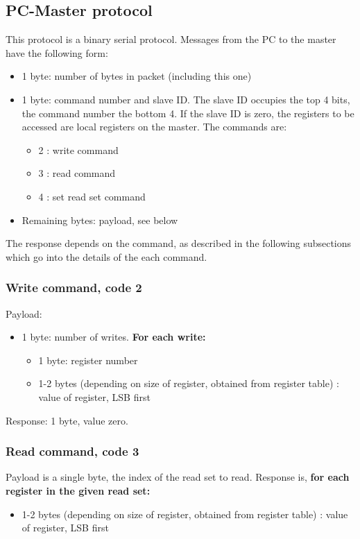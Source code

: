 \subsection{PC-Master protocol}
This protocol is a binary serial protocol. Messages from
the PC to the master have the following form:
\begin{itemize}
\item 1 byte: number of bytes in packet (including this one)
\item 1 byte: command number and slave ID. The slave ID occupies
the top 4 bits, the command number the bottom 4. If the slave
ID is zero, the registers to be accessed are local registers
on the master. The commands are:
\begin{itemize}
\item 2 : write command
\item 3 : read command
\item 4 : set read set command
\end{itemize}
\item Remaining bytes: payload, see below
\end{itemize}
The response depends on the command, as described in the following
subsections which go into the details of  the each command.
\subsubsection{Write command, code 2}
Payload:
\begin{itemize}
\item 1 byte: number of writes. \textbf{For each write:}
\begin{itemize}
\item 1 byte: register number
\item 1-2 bytes (depending on size of register,
obtained from register table) : value of register, LSB first
\end{itemize}
\end{itemize}
Response: 1 byte, value zero.
\subsubsection{Read command, code 3}
Payload is a single byte, the index of the read set to read. Response is, \textbf{for each register in
the given read set:}
\begin{itemize}
\item 1-2 bytes (depending on size of register,
obtained from register table) : value of register, LSB first
\end{itemize}
